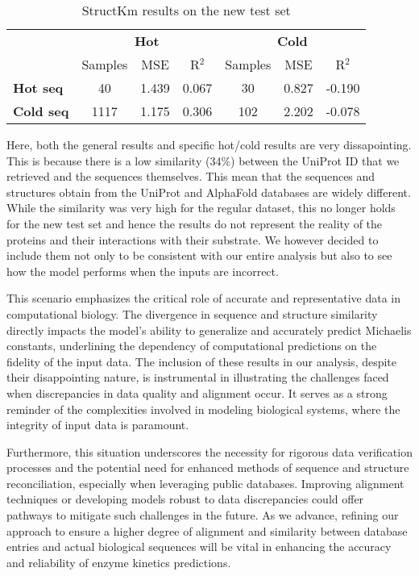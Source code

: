 \begin{table}[ht]
  \centering
  \begin{tabular}{lcccccc}
  \hline
   & \multicolumn{3}{c}{\textbf{Hot}} & \multicolumn{3}{c}{\textbf{Cold}} \\
   & Samples & MSE & R\(^2\) & Samples & MSE & R\(^2\) \\ \hline
  \textbf{Hot seq}  & 40 & 1.439 & 0.067 & 30 & 0.827 & -0.190 \\
  \textbf{Cold seq} & 1117 & 1.175 & 0.306 & 102 & 2.202 & -0.078 \\ \hline
  \end{tabular}
  \caption{StructKm results on the new test set}
  \label{tab:struct_new_test}
\end{table}

Here, both the general results and specific hot/cold results are very dissapointing. This is because there is a low similarity (34\%) between the UniProt ID that we retrieved and the sequences themselves. This mean that the sequences and structures obtain from the UniProt and AlphaFold databases are widely different. While the similarity was very high for the regular dataset, this no longer holds for the new test set and hence the results do not represent the reality of the proteins and their interactions with their substrate. We however decided to include them not only to be consistent with our entire analysis but also to see how the model performs when the inputs are incorrect.

This scenario emphasizes the critical role of accurate and representative data in computational biology. The divergence in sequence and structure similarity directly impacts the model's ability to generalize and accurately predict Michaelis constants, underlining the dependency of computational predictions on the fidelity of the input data. The inclusion of these results in our analysis, despite their disappointing nature, is instrumental in illustrating the challenges faced when discrepancies in data quality and alignment occur. It serves as a strong reminder of the complexities involved in modeling biological systems, where the integrity of input data is paramount.

Furthermore, this situation underscores the necessity for rigorous data verification processes and the potential need for enhanced methods of sequence and structure reconciliation, especially when leveraging public databases. Improving alignment techniques or developing models robust to data discrepancies could offer pathways to mitigate such challenges in the future. As we advance, refining our approach to ensure a higher degree of alignment and similarity between database entries and actual biological sequences will be vital in enhancing the accuracy and reliability of enzyme kinetics predictions.


